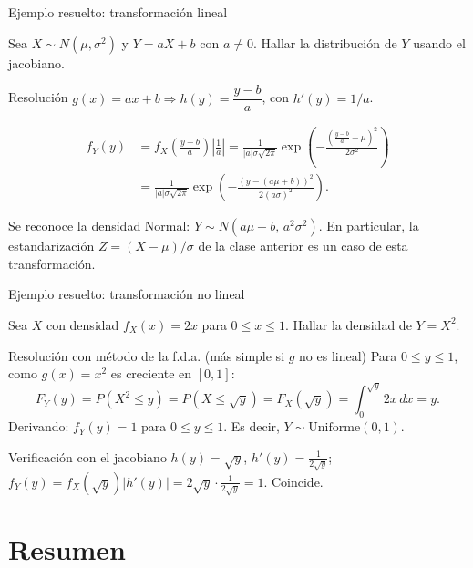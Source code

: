 \documentclass[aspectratio=169,11pt]{beamer}
\begin{document}
\begin{frame}{Ejemplo resuelto: transformación lineal}
\begin{example}
Sea $X\sim N(\mu,\sigma^2)$ y $Y = aX+b$ con $a\ne 0$. Hallar la distribución de $Y$ usando el jacobiano.
\end{example}

\begin{block}{Resolución}
$g(x)=ax+b \Rightarrow h(y) = \dfrac{y-b}{a}$, con $h'(y) = 1/a$.

$$
\begin{aligned}
f_Y(y) &= f_X\!\left(\frac{y-b}{a}\right)\left|\frac{1}{a}\right| = \frac{1}{|a|\sigma\sqrt{2\pi}}\exp\left(-\frac{\left(\frac{y-b}{a}-\mu\right)^2}{2\sigma^2}\right) \\
&= \frac{1}{|a|\sigma\sqrt{2\pi}}\exp\left(-\frac{(y-(a\mu+b))^2}{2(a\sigma)^2}\right).
\end{aligned}
$$

Se reconoce la densidad Normal: $Y\sim N(a\mu+b,\, a^2\sigma^2)$. En particular, la estandarización $Z=(X-\mu)/\sigma$ de la clase anterior es un caso de esta transformación.
\end{block}
\end{frame}

\begin{frame}{Ejemplo resuelto: transformación no lineal}
\begin{example}
Sea $X$ con densidad $f_X(x)=2x$ para $0\le x\le 1$. Hallar la densidad de $Y=X^2$.
\end{example}

\begin{block}{Resolución con método de la f.d.a. (más simple si $g$ no es lineal)}
Para $0\le y\le 1$, como $g(x)=x^2$ es creciente en $[0,1]$:
$$F_Y(y) = P(X^2\le y) = P(X\le \sqrt{y}) = F_X(\sqrt{y}) = \int_0^{\sqrt{y}} 2x\,dx = y.$$
Derivando: $f_Y(y) = 1$ para $0\le y\le 1$. Es decir, $Y\sim \text{Uniforme}(0,1)$.
\end{block}

\begin{alertblock}{Verificación con el jacobiano}
$h(y)=\sqrt{y}$, $h'(y) = \frac{1}{2\sqrt{y}}$; $f_Y(y) = f_X(\sqrt{y})|h'(y)| = 2\sqrt{y}\cdot\frac{1}{2\sqrt{y}} = 1$. Coincide.
\end{alertblock}
\end{frame}

\section{Resumen}
\end{document}
